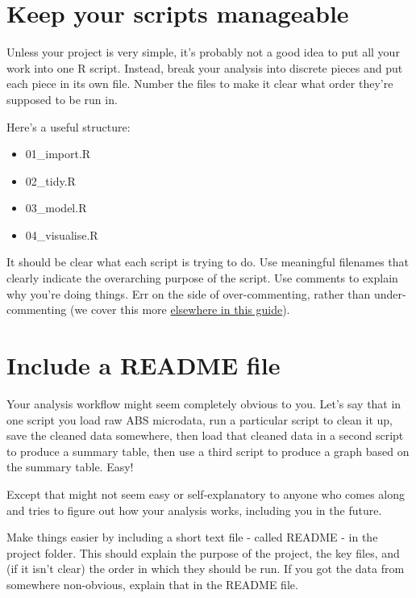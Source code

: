 \documentclass[]{book}
\providecommand{\tightlist}{%
  \setlength{\itemsep}{0pt}\setlength{\parskip}{0pt}}
\begin{document}
\hypertarget{manageable}{%
\section{Keep your scripts manageable}\label{manageable}}

Unless your project is very simple, it's probably not a good idea to put all your work into one R script. Instead, break your analysis into discrete pieces and put each piece in its own file. Number the files to make it clear what order they're supposed to be run in.

Here's a useful structure:

\begin{itemize}
\tightlist
\item
  01\_import.R
\item
  02\_tidy.R
\item
  03\_model.R
\item
  04\_visualise.R
\end{itemize}

It should be clear what each script is trying to do. Use meaningful filenames that clearly indicate the overarching purpose of the script. Use comments to explain why you're doing things. Err on the side of over-commenting, rather than under-commenting (we cover this more \protect\hyperlink{use-comments}{elsewhere in this guide}).

\hypertarget{README}{%
\section{Include a README file}\label{README}}

Your analysis workflow might seem completely obvious to you. Let's say that in one script you load raw ABS microdata, run a particular script to clean it up, save the cleaned data somewhere, then load that cleaned data in a second script to produce a summary table, then use a third script to produce a graph based on the summary table. Easy!

Except that might not seem easy or self-explanatory to anyone who comes along and tries to figure out how your analysis works, including you in the future.

Make things easier by including a short text file - called README - in the project folder. This should explain the purpose of the project, the key files, and (if it isn't clear) the order in which they should be run. If you got the data from somewhere non-obvious, explain that in the README file.
\end{document}
